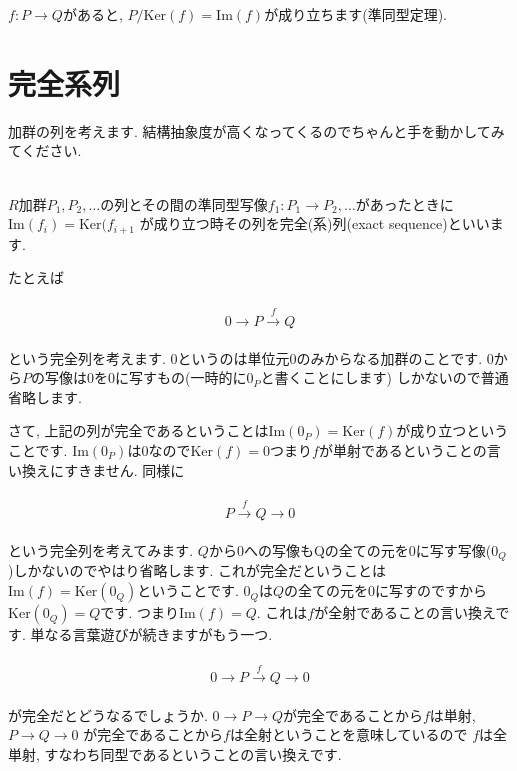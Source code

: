 \documentclass{jsarticle}
\def\Im{\mathrm{Im}}
\def\Ker{\mathrm{Ker}}
\theoremstyle{definition}
\numberwithin{theorem}{section}
\begin{document}
$f: P \rightarrow Q$があると, $P/\Ker(f) = \Im(f)$が成り立ちます(準同型定理).

\section{完全系列}
加群の列を考えます. 結構抽象度が高くなってくるのでちゃんと手を動かしてみてください.

\hrulefill\\

$R$加群$P_1, P_2, \ldots$の列とその間の準同型写像$f_1: P_1 \rightarrow P_2, \ldots$があったときに$\Im(f_i) = \Ker(f_{i+1}$
が成り立つ時その列を完全(系)列(exact sequence)といいます.

たとえば

\begin{eqnarray*}
\begin{aligned}
0 \rightarrow P \xrightarrow{f} Q
\end{aligned}
\end{eqnarray*}

という完全列を考えます. $0$というのは単位元$0$のみからなる加群のことです. $0$から$P$の写像は$0$を$0$に写すもの(一時的に$0_P$と書くことにします)
しかないので普通省略します.

さて, 上記の列が完全であるということは$\Im(0_P) = \Ker(f)$が成り立つということです. $\Im(0_P)$は$0$なので$\Ker(f) = 0$つまり$f$が単射であるということの言い換えにすきません.
同様に

\begin{eqnarray*}
\begin{aligned}
P \xrightarrow{f} Q \rightarrow 0
\end{aligned}
\end{eqnarray*}

という完全列を考えてみます. $Q$から$0$への写像もQの全ての元を$0$に写す写像($0_Q$)しかないのでやはり省略します. これが完全だということは
$\Im(f) = \Ker(0_Q)$ということです. $0_Q$は$Q$の全ての元を$0$に写すのですから$\Ker(0_Q) = Q$です. つまり$\Im(f) = Q$.
これは$f$が全射であることの言い換えです. 単なる言葉遊びが続きますがもう一つ.

\begin{eqnarray*}
\begin{aligned}
0 \rightarrow P \xrightarrow{f} Q \rightarrow 0
\end{aligned}
\end{eqnarray*}

が完全だとどうなるでしょうか. $0 \rightarrow P \rightarrow Q$が完全であることから$f$は単射, $P\rightarrow Q \rightarrow 0$
が完全であることから$f$は全射ということを意味しているので $f$は全単射, すなわち同型であるということの言い換えです.
\end{document}
